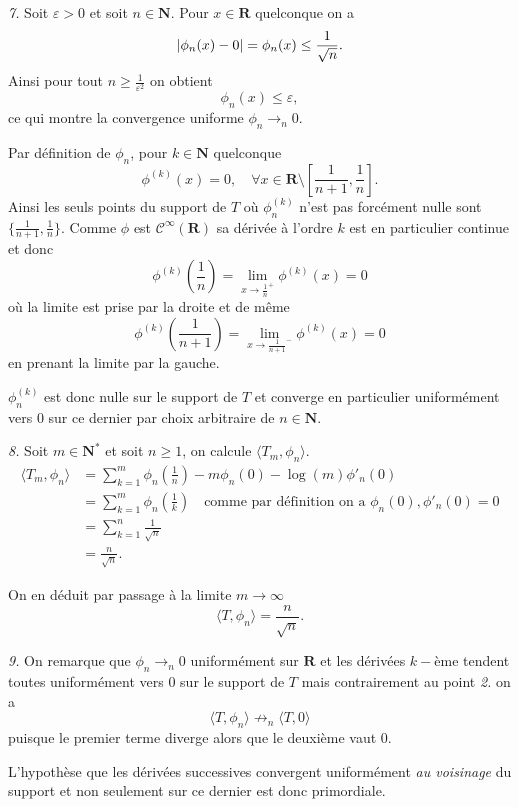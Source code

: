 \documentclass[12pt]{article}
\newcommand{\R}{\mathbf{R}}
\newcommand{\N}{\mathbf{N}}
\begin{document}
\medskip

\textit{7.} Soit $\varepsilon > 0$ et soit $n \in \N$. Pour $x \in \R$ quelconque on a \[
        |\phi_{n}(x) - 0| = \phi_{n}(x) \le \frac{1}{\sqrt{n}} \\
.\] Ainsi pour tout $n \ge \frac{1}{\varepsilon^{2}}$ on obtient \[
\phi_{n}(x) \le \varepsilon
,\] ce qui montre la convergence uniforme $\phi_{n} \to_{n} 0$. 

Par définition de $\phi_{n}$, pour $k \in \N$ quelconque
\[
        \phi^{(k)}(x) = 0, \quad \forall x \in \R\setminus[\frac{1}{n+1}, \frac{1}{n}]
.\] Ainsi les seuls points du support de $T$ où $\phi_{n}^{(k)}$  n'est pas forcément nulle sont $\{\frac{1}{n+1}, \frac{1}{n}\}$.
Comme $\phi$ est $\mathcal{C}^{\infty}(\R)$ sa dérivée à l'ordre $k$ est en particulier continue et donc \[
        \phi^{(k)}(\frac{1}{n}) = \lim_{x\to \frac{1}{n}^{+}} \phi^{(k)}(x) = 0
\] où la limite est prise par la droite et de même \[
        \phi^{(k)}(\frac{1}{n+1}) = \lim_{x\to \frac{1}{n+1}^{-}} \phi^{(k)}(x) = 0
\] en prenant la limite par la gauche. 

$\phi_{n}^{(k)}$ est donc nulle sur le support de $T$ et converge en particulier uniformément vers 0 sur ce dernier par choix arbitraire de $n \in \N$.
\medskip

\textit{8.} Soit $m \in \N^{*}$ et soit $n \ge 1$, on calcule $\langle T_{m}, \phi_{n}\rangle$.
\begin{align*}
        \langle T_{m}, \phi_{n} \rangle &= \sum_{k=1}^{m} \phi_{n}(\frac{1}{n}) - m\phi_{n}(0) - \log(m)\phi'_{n}(0) \\
                                        &= \sum_{k=1}^{m} \phi_{n}(\frac{1}{k}) \quad \text{comme par définition on a } \phi_{n}(0), \phi'_{n}(0) = 0 \\
                                        &= \sum_{k=1}^{n} \frac{1}{\sqrt{n}} \\
                                        &= \frac{n}{\sqrt{n}}
.\end{align*}

On en déduit par passage à la limite $m \to \infty$ \[
        \boxed{\langle T, \phi_{n} \rangle = \frac{n}{\sqrt{n}}.} 
\] 
\medskip

\textit{9.} On remarque que $\phi_{n} \to_{n} 0$ uniformément sur $\R$ et les dérivées $k-$ème tendent toutes uniformément vers 0 sur le support de $T$ mais contrairement au point \textit{2.} on a 
 \[
         \boxed{\langle T, \phi_{n} \rangle \not\to_{n} \langle T, 0 \rangle}
\] puisque le premier terme diverge alors que le deuxième vaut 0. 

L'hypothèse que les dérivées successives convergent uniformément \emph{au voisinage} du support et non seulement sur ce dernier est donc primordiale.
\end{document}
